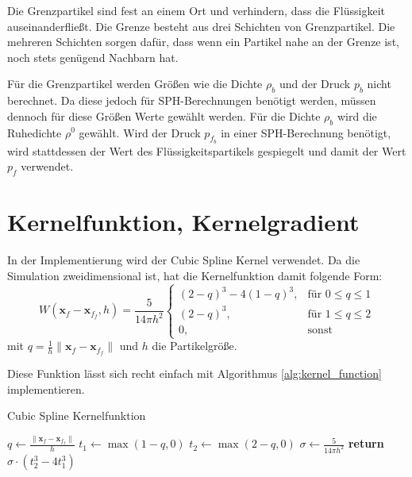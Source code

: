 \documentclass[11pt,
a4paper,
parskip=half, %
BCOR=10mm, %
english,
ngerman]{scrreprt}
\begin{document}
Die Grenzpartikel sind fest an einem Ort und verhindern, dass die Flüssigkeit auseinanderfließt.
Die Grenze besteht aus drei Schichten von Grenzpartikel.
Die mehreren Schichten sorgen dafür, dass wenn ein Partikel nahe an der Grenze ist, noch stets genügend Nachbarn hat.

Für die Grenzpartikel werden Größen wie die Dichte $\rho_b$ und der Druck $p_b$ nicht berechnet.
Da diese jedoch für SPH-Berechnungen benötigt werden, müssen dennoch für diese Größen Werte gewählt werden.
Für die Dichte $\rho_b$ wird die Ruhedichte $\rho^0$ gewählt.
Wird der Druck $p_{f_b}$ in einer SPH-Berechnung benötigt, wird stattdessen der Wert des Flüssigkeitspartikels gespiegelt und damit der Wert $p_f$ verwendet.


\section{Kernelfunktion, Kernelgradient}
In der Implementierung wird der Cubic Spline Kernel verwendet.
Da die Simulation zweidimensional ist, hat die Kernelfunktion damit folgende Form:
\begin{equation}
    W(\textbf{x}_f - \textbf{x}_{f_f}, h) = \frac{5}{14\pi h^2} \begin{cases}
        (2-q)^3 - 4(1-q)^3, &\text{für } 0 \leq q \leq 1\\
        (2-q)^3, &\text{für } 1 \leq q \leq 2\\
        0, &\text{sonst}
    \end{cases}
\end{equation}
mit $q = \frac{1}{h}\|\textbf{x}_f - \textbf{x}_{f_f}\|$ und $h$ die Partikelgröße.

Diese Funktion lässt sich recht einfach mit Algorithmus \ref{alg:kernel_function} implementieren.
\begin{algorithm}
    \caption{Cubic Spline Kernelfunktion}
    \label{alg:kernel_function}
    \begin{algorithmic}[1]
            \State $q \gets \frac{\|\textbf{x}_f - \textbf{x}_{f_f}\|}{h}$
            \State $t_1 \gets \max(1 - q, 0)$
            \State $t_2 \gets \max(2 - q, 0)$
            \State $\sigma \gets \frac{5}{14 \pi h^2}$
            \State \textbf{return} $\sigma \cdot (t_2^3 - 4t_1^3)$
        \EndFunction
    \end{algorithmic}
\end{algorithm}
\end{document}
